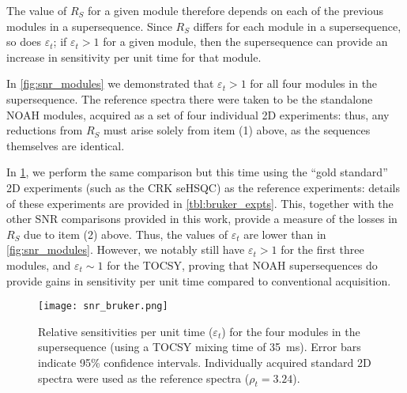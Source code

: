 The value of $R_S$ for a given module therefore depends on each of the previous modules in a supersequence.
Since $R_S$ differs for each module in a supersequence, so does $\varepsilon_t$; if $\varepsilon_t > 1$ for a given module, then the supersequence can provide an increase in sensitivity per unit time for that module.

In \cref{fig:snr_modules} we demonstrated that $\varepsilon_t > 1$ for all four modules in the  supersequence.
The reference spectra there were taken to be the standalone NOAH modules, acquired as a set of four individual 2D experiments: thus, any reductions from $R_S$ must arise solely from item (1) above, as the sequences themselves are identical.

In \cref{fig:snr_bruker}, we perform the same comparison but this time using the ``gold standard'' 2D experiments (such as the CRK seHSQC) as the reference experiments: details of these experiments are provided in \cref{tbl:bruker_expts}.
This, together with the other SNR comparisons provided in this work, provide a measure of the losses in $R_S$ due to item (2) above.
Thus, the values of $\varepsilon_t$ are lower than in \cref{fig:snr_modules}.
However, we notably still have $\varepsilon_t > 1$ for the first three modules, and $\varepsilon_t \sim 1$ for the TOCSY, proving that NOAH supersequences do provide gains in sensitivity per unit time compared to conventional acquisition.

\begin{figure}
    \centering
    \texttt{[image: snr\_bruker.png]}
    \caption{
        Relative sensitivities per unit time ($\varepsilon_t$) for the four modules in the  supersequence (using a TOCSY mixing time of \SI{35}{\ms}).
        Error bars indicate 95\% confidence intervals.
        Individually acquired standard 2D spectra were used as the reference spectra ($\rho_t = 3.24$).
        \zolmi{}
    }
    \label{fig:snr_bruker}
\end{figure}

